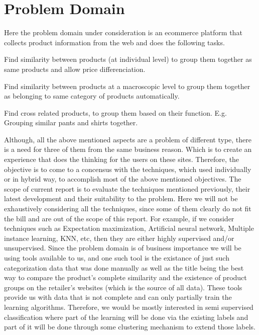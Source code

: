\documentclass[12pt]{book}
\begin{document}
\section{Problem Domain}
Here the problem domain under consideration is an ecommerce platform that collects product information from the web and does the following tasks.
\begin{itemize*}
  \item Find similarity between products (at individual level) to group them together as same products and allow price differenciation.
  \item Find similarity between products at a macroscopic level to group them together as belonging to same category of products automatically.
  \item Find cross related products, to group them based on their function. E.g. Grouping similar pants and shirts together.
\end{itemize*}

Although, all the above mentioned aspects are a problem of different type, there is a need for three of them from the same business reason. Which is to  create an experience that does the thinking for the users on these sites. Therefore, the objective is to come to a concensus with the techniques, which  used individually or in hybrid way, to accomplish most of the above mentioned objectives. The scope of current report is to evaluate the techniques mentioned previously, their latest development and their suitability to the problem. Here we will not be exhaustively considering all the techniques, since some of them clearly do not fit the bill and are out of the scope of this report. For example, if we consider techniques such as Expectation maximization, Artificial neural network, Multiple instance learning, KNN, etc, 
then they are either highly supervised and/or unsupervised. Since the problem domain is of business importance we will be using tools available to us, and one such tool is the existance of just such categorization data that was done manually as well as the title being the best way to compare the product's complete similarity and the existence of product groups on the retailer's websites (which is the source of all data). These tools
provide us with data that is not complete and can only partially train the learning algorithms. Therefore, we would be mostly interested in semi supervised classification where part of the learning will be done via the existing labels and part of it will be done through some clustering mechanism to extend those labels. 
\end{document}
